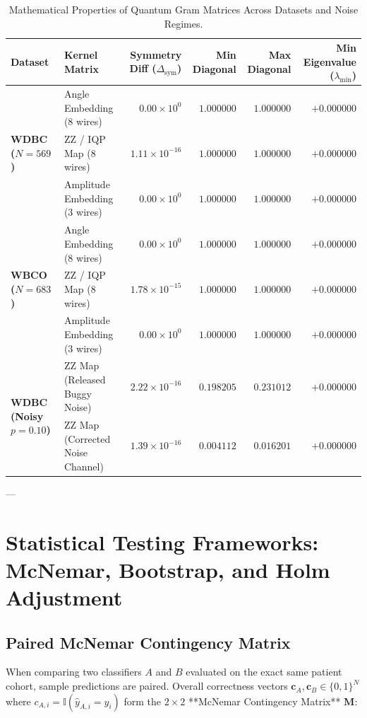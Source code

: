 \documentclass[11pt,a4paper]{article}
\begin{document}
\begin{table}[H]
\centering
\small
\caption{Mathematical Properties of Quantum Gram Matrices Across Datasets and Noise Regimes.}
\label{tab:gram_metrics}
\begin{tabularx}{\textwidth}{llrrrr}
\toprule
\textbf{Dataset} & \textbf{Kernel Matrix} & \textbf{Symmetry Diff ($\Delta_{\text{sym}}$)} & \textbf{Min Diagonal} & \textbf{Max Diagonal} & \textbf{Min Eigenvalue ($\lambda_{\min}$)} \\
\midrule
\multirow{3}{*}{\textbf{WDBC ($N=569$)}} 
& Angle Embedding ($8$ wires) & $0.00 \times 10^0$ & $1.000000$ & $1.000000$ & $+0.000000$ \\
& ZZ / IQP Map ($8$ wires) & $1.11 \times 10^{-16}$ & $1.000000$ & $1.000000$ & $+0.000000$ \\
& Amplitude Embedding ($3$ wires) & $0.00 \times 10^0$ & $1.000000$ & $1.000000$ & $+0.000000$ \\
\midrule
\multirow{3}{*}{\textbf{WBCO ($N=683$)}} 
& Angle Embedding ($8$ wires) & $0.00 \times 10^0$ & $1.000000$ & $1.000000$ & $+0.000000$ \\
& ZZ / IQP Map ($8$ wires) & $1.78 \times 10^{-15}$ & $1.000000$ & $1.000000$ & $+0.000000$ \\
& Amplitude Embedding ($3$ wires) & $0.00 \times 10^0$ & $1.000000$ & $1.000000$ & $+0.000000$ \\
\midrule
\multirow{2}{*}{\textbf{WDBC (Noisy $p=0.10$)}} 
& ZZ Map (Released Buggy Noise) & $2.22 \times 10^{-16}$ & $0.198205$ & $0.231012$ & $+0.000000$ \\
& ZZ Map (Corrected Noise Channel) & $1.39 \times 10^{-16}$ & $0.004112$ & $0.016201$ & $+0.000000$ \\
\bottomrule
\end{tabularx}
\end{table}

---

\section{Statistical Testing Frameworks: McNemar, Bootstrap, and Holm Adjustment}

\subsection{Paired McNemar Contingency Matrix}

When comparing two classifiers $A$ and $B$ evaluated on the exact same patient cohort, sample predictions are paired. Overall correctness vectors $\mathbf{c}_A, \mathbf{c}_B \in \{0, 1\}^N$ where $c_{A,i} = \mathbb{I}(\hat{y}_{A,i} = y_i)$ form the $2 \times 2$ **McNemar Contingency Matrix** $\mathbf{M}$:
\end{document}
